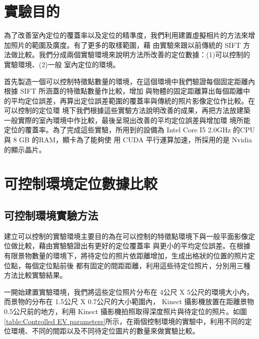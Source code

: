 

\section{實驗目的}
	
	為了改善室內定位的覆蓋率以及定位的精準度，我們利用建置虛擬相片的方法來增加照片的範圍及廣度。有了更多的取樣範圍，藉
由實驗來跟以前傳統的 SIFT 方法做比較。我們分成兩個實驗環境來說明方法所改善的定位數據：(1)可以控制的實驗環境、(2)一般
室內定位的環境。

	首先製造一個可以控制特徵點數量的環境，在這個環境中我們驗證每個固定距離內根據 SIFT 所涵蓋的特徵點數量作比較，增加
與物體的固定距離算出每個距離中的平均定位誤差，再算出定位誤差範圍的覆蓋率與傳統的照片影像定位作比較。在可以控制的定位環
境下我們根據這些實驗方法說明改善的成果，再把方法放建築一般實際的室內環境中作比較，最後呈現出改善的平均定位誤差與增加環
境所能定位的覆蓋率。為了完成這些實驗，所用到的設備為  Intel Core I5 2.0GHz 的CPU與 8 GB 的RAM，顯卡為了能夠使
用 CUDA 平行運算加速，所採用的是 Nvidia 的顯示晶片。

\section{可控制環境定位數據比較}


\subsection{可控制環境實驗方法}
	建立可以控制的實驗環境主要目的為在可以控制的特徵點環境下與一般平面影像定位做比較，藉由實驗驗證出有更好的定位覆蓋率
與更小的平均定位誤差。在根據有限景物數量的環境下，將待定位的照片依距離增加，生成出格狀的位置的照片定位點，每個定位點前後
都有固定的間距距離，利用這些待定位照片，分別用三種方法比較實驗結果。

	一開始建置實驗環境，我們將這些定位照片分布在 4公尺 X 5公尺的環境大小內，而景物的分布在 1.5公尺 X 0.7公尺的大小範圍內， 
Kinect 攝影機放置在距離景物 0.5公尺前的地方，利用 Kinect 攝影機拍照取得深度照片與待定位的照片。如圖\ref{table:Controlled 
EV parameters}所示，在兩個控制環境的實驗中，利用不同的定位環境、不同的間距以及不同待定位圖片的數量來做實驗比較。
		
		
		

